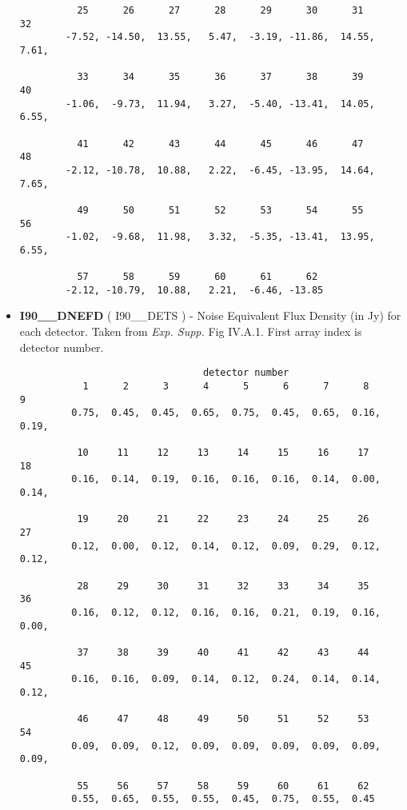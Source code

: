 \begin{itemize}
\begin{minipage}[t]{\textwidth}
\begin{verbatim}
          25      26      27      28      29      30      31      32
        -7.52, -14.50,  13.55,   5.47,  -3.19, -11.86,  14.55,   7.61,

          33      34      35      36      37      38      39      40
        -1.06,  -9.73,  11.94,   3.27,  -5.40, -13.41,  14.05,   6.55,

          41      42      43      44      45      46      47      48
        -2.12, -10.78,  10.88,   2.22,  -6.45, -13.95,  14.64,   7.65,

          49      50      51      52      53      54      55      56
        -1.02,  -9.68,  11.98,   3.32,  -5.35, -13.41,  13.95,   6.55,

          57      58      59      60      61      62
        -2.12, -10.79,  10.88,   2.21,  -6.46, -13.85

\end{verbatim}
\normalsize
\end{minipage}

\item {\bf I90\_\_DNEFD} ( I90\_\_DETS ) -   Noise Equivalent  Flux Density (in Jy)
for each detector. Taken from {\em Exp.  Supp.} Fig IV.A.1. First array index is detector number.

\begin{minipage}[t]{\textwidth}
\small
\begin{verbatim}
                                detector number
           1      2      3      4      5      6      7      8      9
         0.75,  0.45,  0.45,  0.65,  0.75,  0.45,  0.65,  0.16,  0.19,  

          10     11     12     13     14     15     16     17     18
         0.16,  0.14,  0.19,  0.16,  0.16,  0.16,  0.14,  0.00,  0.14,  

          19     20     21     22     23     24     25     26     27
         0.12,  0.00,  0.12,  0.14,  0.12,  0.09,  0.29,  0.12,  0.12,  

          28     29     30     31     32     33     34     35     36
         0.16,  0.12,  0.12,  0.16,  0.16,  0.21,  0.19,  0.16,  0.00,  

          37     38     39     40     41     42     43     44     45
         0.16,  0.16,  0.09,  0.14,  0.12,  0.24,  0.14,  0.14,  0.12,  

          46     47     48     49     50     51     52     53     54
         0.09,  0.09,  0.12,  0.09,  0.09,  0.09,  0.09,  0.09,  0.09,

          55     56     57     58     59     60     61     62
         0.55,  0.65,  0.55,  0.55,  0.45,  0.75,  0.55,  0.45


\end{verbatim}
\end{minipage}
\end{itemize}

